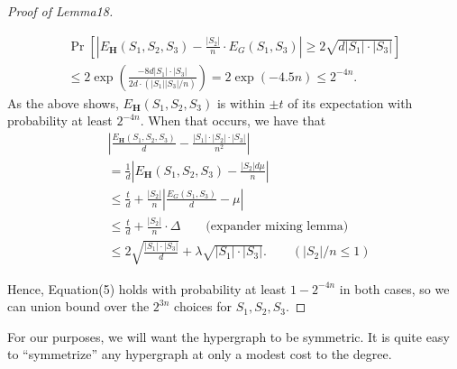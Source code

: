 \documentclass[10pt,a4paper]{article}
\begin{document}
\begin{proof}[Proof of Lemma18]
\begin{enumerate}
\begin{multline*}
\Pr\left[\left|E_{\mathbf H}(S_1,S_2,S_3)-\frac{|S_2|}n\cdot E_G(S_1,S_3)\right|\geq2\sqrt{d|S_1|\cdot|S_3|}\right]\\
\leq2\exp\left(\frac{-8d|S_1|\cdot|S_3|}{2d\cdot(|S_1||S_3|/n)}\right)=2\exp(-4.5n)\leq2^{-4n}.
\end{multline*}
As the above shows, $E_{\mathbf H}(S_1,S_2,S_3)$ is within $\pm t$ of its expectation with probability at least $2^{-4n}$. When that occurs, we have that
\begin{align*}
&\left|\frac{E_{\mathbf H}(S_1,S_2,S_3)}d-\frac{|S_1|\cdot|S_2|\cdot|S_3|}{n^2}\right|\\
&=\frac1d\left|E_{\mathbf H}(S_1,S_2,S_3)-\frac{|S_2|d\mu}n\right|\\
&\leq\frac td+\frac{|S_2|}n\left|\frac{E_G(S_1,S_3)}d-\mu\right|\\
&\leq\frac td+\frac{|S_2|}n\cdot\Delta\qquad\text{(expander mixing lemma)}\\
&\leq2\sqrt{\frac{|S_1|\cdot|S_3|}d}+\lambda\sqrt{|S_1|\cdot|S_3|}.\qquad(|S_2|/n\leq1)
\end{align*}
\end{enumerate}
Hence, Equation(5) holds with probability at least $1-2^{-4n}$ in both cases, so we can union bound over the $2^{3n}$ choices for $S_1,S_2,S_3$.
\end{proof}
For our purposes, we will want the hypergraph to be symmetric. It is quite easy to ``symmetrize'' any hypergraph at only a modest cost to the degree.
\end{document}
